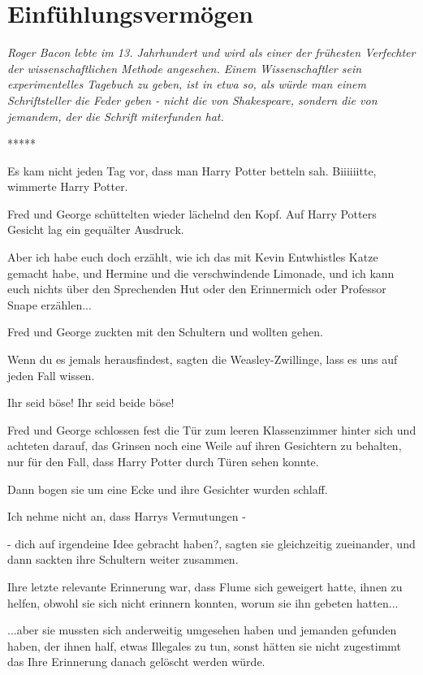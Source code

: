 \chapter{Einfühlungsvermögen}

\emph{Roger Bacon lebte im 13. Jahrhundert und wird als einer der frühesten
Verfechter der wissenschaftlichen Methode angesehen. Einem Wissenschaftler sein
experimentelles Tagebuch zu geben, ist in etwa so, als würde man einem
Schriftsteller die Feder geben - nicht die von Shakespeare, sondern die von
jemandem, der die Schrift miterfunden hat.}

\begin{center}*****\end{center}

Es kam nicht jeden Tag vor, dass man Harry Potter betteln sah. \glqq{}
Biiiiiitte\grqq{}, wimmerte Harry Potter.

Fred und George schüttelten wieder lächelnd den Kopf. Auf Harry Potters Gesicht
lag ein gequälter Ausdruck.

\glqq{}Aber ich habe euch doch erzählt, wie ich das mit Kevin Entwhistles Katze
gemacht habe, und Hermine und die verschwindende Limonade, und ich kann euch
nichts über den Sprechenden Hut oder den Erinnermich oder Professor Snape
erzählen...\grqq{}

Fred und George zuckten mit den Schultern und wollten gehen.

\glqq{}Wenn du es jemals herausfindest\grqq{}, sagten die Weasley-Zwillinge,
\glqq{}lass es uns auf jeden Fall wissen.\grqq{}

\glqq{}Ihr seid böse! Ihr seid beide böse!\grqq{}

Fred und George schlossen fest die Tür zum leeren Klassenzimmer hinter sich und
achteten darauf, das Grinsen noch eine Weile auf ihren Gesichtern zu behalten,
nur für den Fall, dass Harry Potter durch Türen sehen konnte.

Dann bogen sie um eine Ecke und ihre Gesichter wurden schlaff.

\glqq{}Ich nehme nicht an, dass Harrys Vermutungen -\grqq{}

\glqq{}- dich auf irgendeine Idee gebracht haben?\grqq{}, sagten sie
gleichzeitig zueinander, und dann sackten ihre Schultern weiter zusammen.

Ihre letzte relevante Erinnerung war, dass Flume sich geweigert hatte, ihnen zu
helfen, obwohl sie sich nicht erinnern konnten, worum sie ihn gebeten hatten...

...aber sie mussten sich anderweitig umgesehen haben und jemanden gefunden
haben, der ihnen half, etwas Illegales zu tun, sonst hätten sie nicht zugestimmt
das Ihre Erinnerung danach gelöscht werden würde.

